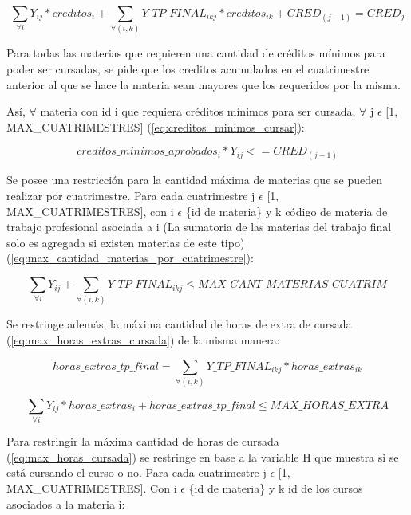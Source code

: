 \documentclass[a4paper]{article}
\begin{document}
\begin{equation}\label{eq:creditos_acumulados}
\sum_{\forall i} Y_{ij} * creditos_i + \sum_{\forall (i,k)} Y\_TP\_FINAL_{ikj} * creditos_{ik} + CRED_{(j-1)} = CRED_j
\end{equation}

Para todas las materias que requieren una cantidad de créditos mínimos para poder ser cursadas, se pide que los creditos acumulados en el cuatrimestre anterior al que se hace la materia sean mayores que los requeridos por la misma.

Así, $\forall$ materia con id i que requiera créditos mínimos para ser cursada, $\forall$ j $\epsilon$ [1, MAX\_CUATRIMESTRES] (\ref{eq:creditos_minimos_cursar}):

\begin{equation}\label{eq:creditos_minimos_cursar}
creditos\_minimos\_aprobados_i * Y_{ij} <= CRED_{(j-1)}
\end{equation}

Se posee una restricción para la cantidad máxima de materias que se pueden realizar por cuatrimestre. Para cada cuatrimestre j $\epsilon$ [1, MAX\_CUATRIMESTRES], con i $\epsilon$ \{id de materia\} y k código de materia de trabajo profesional asociada a i (La sumatoria de las materias del trabajo final solo es agregada si existen materias de este tipo) (\ref{eq:max_cantidad_materias_por_cuatrimestre}):

\begin{equation}\label{eq:max_cantidad_materias_por_cuatrimestre}
\sum_{\forall i} Y_{ij} + \sum_{\forall (i,k)} Y\_TP\_FINAL_{ikj} \leq MAX\_CANT\_MATERIAS\_CUATRIM
\end{equation}

Se restringe además, la máxima cantidad de horas de extra de cursada (\ref{eq:max_horas_extras_cursada}) de la misma manera:

\begin{equation}
horas\_extras\_tp\_final = \sum_{\forall (i,k)} Y\_TP\_FINAL_{ikj} * horas\_extras_{ik}
\end{equation}

\begin{equation}\label{eq:max_horas_extras_cursada}
\sum_{\forall i} Y_{ij} * horas\_extras_i + horas\_extras\_tp\_final \leq MAX\_HORAS\_EXTRA
\end{equation}

Para restringir la máxima cantidad de horas de cursada (\ref{eq:max_horas_cursada}) se restringe en base a la variable H que muestra si se está cursando el curso o no. Para cada cuatrimestre j $\epsilon$ [1, MAX\_CUATRIMESTRES]. Con i $\epsilon$ \{id de materia\} y k id de los cursos asociados a la materia i:
\end{document}
